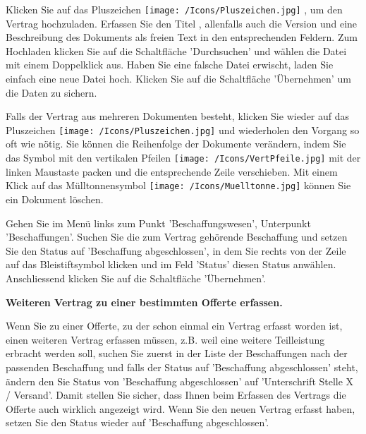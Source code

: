 Klicken Sie auf das Pluszeichen \texttt{[image: /Icons/Pluszeichen.jpg]} , um den Vertrag hochzuladen. Erfassen Sie den Titel , allenfalls auch die Version  und eine Beschreibung des Dokuments  als freien Text in den entsprechenden Feldern. Zum Hochladen klicken Sie auf die Schaltfläche 'Durchsuchen'  und wählen die Datei mit einem Doppelklick aus. Haben Sie eine falsche Datei erwischt, laden Sie einfach eine neue Datei hoch. Klicken Sie auf die Schaltfläche 'Übernehmen'  um die Daten zu sichern.

\vspace{\baselineskip}

Falls der Vertrag aus mehreren Dokumenten besteht, klicken Sie wieder auf das Pluszeichen \texttt{[image: /Icons/Pluszeichen.jpg]}  und wiederholen den Vorgang so oft wie nötig. Sie können die Reihenfolge der Dokumente verändern, indem Sie das Symbol mit den vertikalen Pfeilen \texttt{[image: /Icons/VertPfeile.jpg]}  mit der linken\textcolor{red}{ }Maustaste packen und die entsprechende Zeile verschieben. Mit einem Klick auf das Mülltonnensymbol \texttt{[image: /Icons/Muelltonne.jpg]}  können Sie ein Dokument löschen.

\vspace{\baselineskip}

Gehen Sie im Menü links zum Punkt 'Beschaffungswesen', Unterpunkt 'Beschaffungen'. Suchen Sie die zum Vertrag gehörende Beschaffung und setzen Sie den Status auf 'Beschaffung abgeschlossen', in dem Sie rechts von der Zeile auf das Bleistiftsymbol klicken und im Feld 'Status' diesen Status anwählen. Anschliessend klicken Sie auf die Schaltfläche 'Übernehmen'.

\vspace{\baselineskip}

\textbf{Weiteren Vertrag zu einer bestimmten Offerte erfassen.}

Wenn Sie zu einer Offerte, zu der schon einmal ein Vertrag erfasst worden ist, einen weiteren Vertrag erfassen müssen, z.B. weil eine weitere Teilleistung erbracht werden soll, suchen Sie zuerst in der Liste der Beschaffungen nach der passenden Beschaffung und falls der Status auf 'Beschaffung abgeschlossen' steht, ändern den Sie Status von 'Beschaffung abgeschlossen' auf 'Unterschrift Stelle X / Versand'. Damit stellen Sie sicher, dass Ihnen beim Erfassen des Vertrags die Offerte auch wirklich angezeigt wird. Wenn Sie den neuen Vertrag erfasst haben, setzen Sie den Status wieder auf 'Beschaffung abgeschlossen'.

